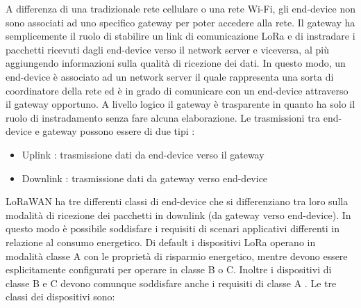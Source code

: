 \documentclass[12pt,a4paper,openright,twoside]{report}
\begin{document}
A differenza di una tradizionale rete cellulare o una rete Wi-Fi, gli end-device non sono associati ad uno specifico gateway per poter accedere alla rete. Il gateway ha semplicemente il ruolo di stabilire un link di comunicazione LoRa e di instradare i pacchetti ricevuti dagli end-device verso il network server e viceversa, al pi\`u aggiungendo informazioni sulla qualit\`a di ricezione dei dati. In questo modo, un end-device \`e associato ad un network server il quale rappresenta una sorta di coordinatore della rete ed \`e in grado di comunicare con un end-device attraverso il gateway opportuno. A livello logico il gateway \`e trasparente in quanto ha solo il ruolo di instradamento senza fare alcuna elaborazione.
Le trasmissioni tra end-device e gateway possono essere di due tipi :
\begin{itemize}                       
\item Uplink : trasmissione dati da end-device verso il gateway
\item Downlink : trasmissione dati da gateway verso end-device
\end{itemize}
LoRaWAN ha tre differenti classi di end-device che si differenziano tra loro sulla modalit\`a di ricezione dei pacchetti in downlink (da gateway verso end-device). In questo modo \`e possibile soddisfare i requisiti di scenari applicativi differenti in relazione al consumo energetico. Di default i dispositivi LoRa operano in modalit\`a classe A con le propriet\`a di risparmio energetico, mentre devono essere esplicitamente configurati per operare in classe B o C. Inoltre i dispositivi di classe B e C devono comunque soddisfare anche i requisiti di classe A \cite{K22}.
Le tre classi dei dispositivi sono:
\end{document}
